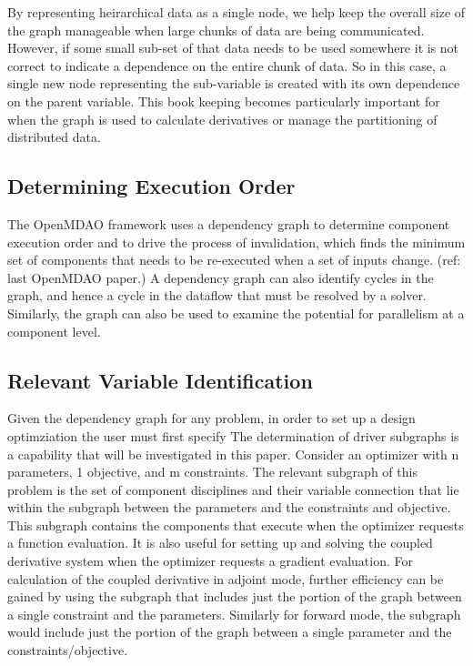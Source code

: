 \documentclass[]{aiaa-tc} %
\begin{document}
    By representing heirarchical data as a single node, we help keep the overall size of the graph manageable 
    when large chunks of data are being communicated. However, if some small sub-set of that data needs to be 
    used somewhere it is not correct to indicate a dependence on the entire chunk of data. So in this case, a 
    single new node representing the sub-variable is created with its own dependence on the parent variable. 
    This book keeping becomes particularly important for when the graph is used to calculate derivatives or 
    manage the partitioning of distributed data. 

    \subsection{Determining Execution Order}
    The OpenMDAO framework uses a dependency graph to determine component execution order and to
    drive the process of invalidation, which finds the minimum set of components that needs to
    be re-executed when a set of inputs change. (ref: last OpenMDAO paper.) A dependency graph
    can also identify cycles in the graph, and hence a cycle in the dataflow that must be resolved
    by a solver. Similarly, the graph can also be used to examine the potential for parallelism at
    a component level.

    \subsection{Relevant Variable Identification}
    Given the dependency graph for any problem, in order to set up a design optimziation the user
    must first specify 
    The determination of driver subgraphs is a capability that will be investigated in this paper.
    Consider an optimizer with n parameters, 1 objective, and m constraints. The relevant 
    subgraph of this problem is the set of component disciplines and their variable connection that
    lie within the subgraph between the parameters and the constraints and objective. This subgraph
    contains the components that execute when the optimizer requests a function evaluation. It is
    also useful for setting up and solving the coupled derivative system when the optimizer requests
    a gradient evaluation. For calculation of the coupled derivative in adjoint mode, further
    efficiency can be gained by using the subgraph that includes just the portion of the graph 
    between a single constraint and the parameters. Similarly for forward mode, the subgraph would
    include just the portion of the graph between a single parameter and the constraints/objective.
\end{document}

